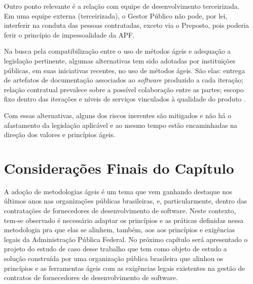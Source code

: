 Outro ponto relevante é a relação com equipe de desenvolvimento terceirizada. Em uma equipe externa (terceirizada), o Gestor Público não pode, por lei, interferir na conduta das pessoas contratadas, exceto via o Preposto, pois poderia ferir o princípio de impessoalidade da APF.

Na busca pela compatibilização entre o uso de métodos ágeis e adequação a legislação pertinente, algumas alternativas tem sido adotadas por instituições públicas, em suas iniciativas recentes, no uso de métodos ágeis. São elas: entrega de artefatos de documentação associados ao \textit{software} produzido a cada iteração; relação contratual prevalece sobre a possível colaboração entre as partes; escopo fixo dentro das iterações e níveis de serviços vinculados à qualidade do produto   \cite{ruas}. 

Com essas alternativas, alguns dos riscos inerentes são mitigados e não há o afastamento da legislação aplicável e ao mesmo tempo estão encaminhadas na direção dos valores e princípios ágeis. 

\section[Considerações Finais do Capítulo]{Considerações Finais do Capítulo}

A adoção de metodologias ágeis é um tema que vem ganhando destaque nos últimos
anos nas organizações públicas brasileiras, e, particularmente, dentro das contratações de fornecedores de desenvolvimento de software. Neste contexto, tem-se observado é necessário
adaptar os princípios e as práticas definidas nessa metodologia pra que elas se alinhem, também, aos
aos princípios e exigências legais da Administração Pública Federal. No próximo capítulo será apresentado o projeto do estudo de caso desse trabalho que tem como objeto de estudo a solução construída por uma organização pública brasileira que alinhou os princípios e as ferramentas ágeis com as exigências legais existentes na gestão de contratos de fornecedores de desenvolvimento de software.